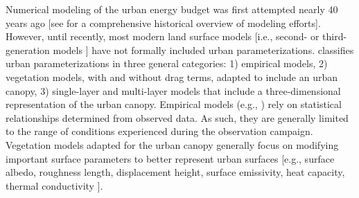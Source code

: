 \documentclass[12pt,authoryear]{elsarticle}
\numberwithin{equation}{section} %
\begin{document}
Numerical modeling of the urban energy budget was first attempted nearly 40 years ago [see \citet{brownUrbanParameterizationsMesoscale2000} for a comprehensive historical overview of modeling efforts]. However, until recently, most modern land surface models [i.e., second- or third-generation models \citep{sellersModelingExchangesEnergy1997}] have not formally included urban parameterizations. \citet{massonUrbanSurfaceModeling2006} classifies urban parameterizations in three general categories: 1) empirical models, 2) vegetation models, with and without drag terms, adapted to include an urban canopy, 3) single-layer and multi-layer models that include a three-dimensional representation of the urban canopy. Empirical models (e.g., \citet{okeUrbanHeatStorage1987}) rely on statistical relationships determined from observed data. As such, they are generally limited to the range of conditions experienced during the observation campaign. Vegetation models adapted for the urban canopy generally focus on modifying important surface parameters to better represent urban surfaces [e.g., surface albedo, roughness length, displacement height, surface emissivity, heat capacity, thermal conductivity \citep{tahaModifyingMesoscaleMeteorological1999,atkinsonNumericalModellingUrban2003,bestRepresentingUrbanAreas2005}].
\end{document}
